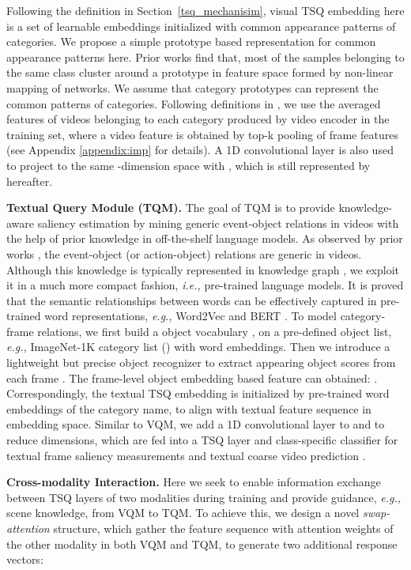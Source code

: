 \documentclass[runningheads]{llncs}
\newcommand{\secref}[1]{Section~\ref{#1}}
\begin{document}
Following the definition in \secref{tsq_mechanisim}, visual TSQ embedding  here is a set of learnable embeddings initialized with common appearance patterns of categories. We propose a simple prototype based representation for common appearance patterns here. Prior works \cite{proto_network} find that, most of the samples belonging to the same class cluster around a prototype in feature space formed by non-linear mapping of networks. We assume that category prototypes can represent the common patterns of categories. Following definitions in \cite{proto_network}, we use the averaged features of videos belonging to each category produced by video encoder in the training set, where a video feature is obtained by top-k pooling of frame features (see Appendix \ref{appendix:imp} for details).
A 1D convolutional layer is also used to project  to the same -dimension space with , which is still represented by  hereafter.


\noindent\textbf{Textual Query Module (TQM).}
The goal of TQM is to provide knowledge-aware saliency estimation by mining generic event-object relations in videos with the help of prior knowledge in off-the-shelf language models. As observed by prior works \cite{15000object,smart2020}, the event-object (or action-object) relations are generic in videos. Although this knowledge is typically represented in knowledge graph \cite{image_text_matching}, we exploit it in a much more compact fashion, \emph{i.e.,} pre-trained language models.
It is proved that the semantic relationships between words can be effectively captured in pre-trained word representations, \emph{e.g.,} Word2Vec \cite{word2vec} and BERT \cite{bert}. To model category-frame relations, we first build a object vocabulary , on a pre-defined object list, \emph{e.g.,} ImageNet-1K category list () with word embeddings. Then we introduce a lightweight but precise object recognizer to extract appearing object scores from each frame . The frame-level object embedding based feature can obtained: . Correspondingly, the textual TSQ embedding  is initialized by pre-trained word embeddings of the category name, to align with textual feature sequence in embedding space. Similar to VQM, we add a 1D convolutional layer to  and  to reduce dimensions, which are fed into a TSQ layer and class-specific classifier for textual frame saliency measurements  and textual coarse video prediction .




\noindent\textbf{Cross-modality Interaction.}
Here we seek to enable information exchange between TSQ layers of two modalities during training and provide guidance, \emph{e.g.,} scene knowledge, from VQM to TQM. To achieve this, we design a novel \textit{swap-attention} structure, which gather the feature sequence with attention weights of the other modality in both VQM and TQM, to generate two additional response vectors: 
\end{document}
